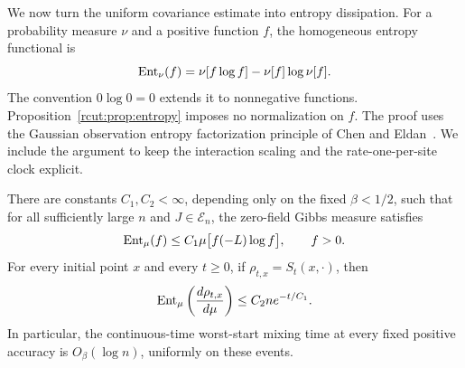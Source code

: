 We now turn the uniform covariance estimate into entropy dissipation.
For a probability measure $\nu$ and a positive function $f$, the
homogeneous entropy functional is
\[
 \operatorname{Ent}_\nu(f)=\nu[f\log f]-\nu[f]\log\nu[f].
\]
The convention $0\log0=0$ extends it to nonnegative functions.
Proposition~\ref{rcut:prop:entropy} imposes no normalization on $f$.
The proof uses the Gaussian observation entropy factorization principle of
Chen and Eldan~\cite[Theorem~49 in arXiv:2203.04163v2]{CE2025}.  We include the argument to keep
the interaction scaling and the rate-one-per-site clock explicit.

\begin{proposition}
\label{rcut:prop:entropy}
There are constants $C_1,C_2<\infty$, depending only on the fixed
$\beta<1/2$, such that for all sufficiently large $n$ and
$J\in\mathcal E_n$, the zero-field Gibbs measure satisfies
\begin{equation}
 \operatorname{Ent}_\mu(f)\le C_1\mu\bigl[f(-L)\log f\bigr],
 \qquad f>0.
 \label{rcut:eq:entropy-inequality}
\end{equation}
For every initial point $x$ and every $t\ge0$, if
$\rho_{t,x}=S_t(x,\cdot)$, then
\begin{equation}
 \operatorname{Ent}_\mu\left(\frac{d\rho_{t,x}}{d\mu}\right)
 \le C_2n e^{-t/C_1}.
 \label{rcut:eq:entropy-decay}
\end{equation}
In particular, the continuous-time worst-start mixing time at every fixed
positive accuracy is $O_\beta(\log n)$, uniformly on these events.
\end{proposition}

